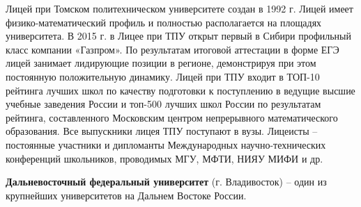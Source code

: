 Лицей при Томском политехническом университете создан в 1992 г. Лицей имеет физико-математический профиль и полностью располагается на площадях университета. В  2015 г.  в Лицее при ТПУ открыт первый в Сибири профильный класс компании «Газпром». По результатам итоговой аттестации в форме ЕГЭ  лицей занимает лидирующие позиции в регионе, демонстрируя при этом постоянную положительную динамику. Лицей при ТПУ входит  в ТОП-10  рейтинга лучших школ по качеству подготовки к поступлению в ведущие высшие учебные заведения России и топ-500 лучших школ России по результатам рейтинга, составленного Московским центром непрерывного математического образования. Все выпускники лицея ТПУ поступают в вузы. Лицеисты – постоянные участники и дипломанты Международных научно-технических конференций школьников, проводимых МГУ, МФТИ, НИЯУ МИФИ и др.

\textbf{Дальневосточный федеральный университет} (г. Владивосток) – один из крупнейших университетов на Дальнем Востоке России.

